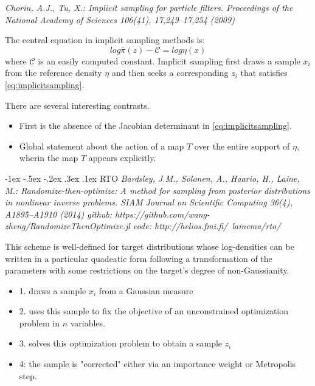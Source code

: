 \documentclass[a4paper, 11pt]{article}
\makeatletter
\newcommand{\xiaosihao}{\fontsize{12pt}{\baselineskip}\selectfont}
\renewcommand\subsubsection{\@startsection{subsubsection}{1}{\z@}%
{-1ex \@plus -.5ex \@minus -.2ex}%
{.3ex \@plus .1ex}%
{\normalfont\xiaosihao\CJKfamily{hei}}}
\makeatother
\begin{document}
\begin{CJK}{UTF8}{gbsn}
\emph{ Chorin, A.J., Tu, X.: Implicit sampling for particle filters. Proceedings of the National Academy of Sciences
106(41), 17,249–17,254 (2009)}

The central equation in implicit sampling methods is:
\begin{equation}\label{eq:implicitsampling}
log \bar{\pi}(z) - \mathcal{C} = log \eta(x)
\end{equation}
where $\mathcal{C}$ is an easily computed constant. Implicit sampling first draws a sample $x_i$ from the reference density $\eta$ and then seeks a corresponding $z_i$ that satisfies \eqref{eq:implicitsampling}.

There are several interesting contrasts.
\begin{itemize}
  \item First is the absence of the Jacobian determinant in \eqref{eq:implicitsampling}.
  \item Global statement about the action of a map $T$ over the entire support of $\eta$, wherin the map $T$ appears explicitly.
\end{itemize}



\subsubsection{RTO}
\emph{
  Bardsley, J.M., Solonen, A., Haario, H., Laine, M.: Randomize-then-optimize: A method for sampling
from posterior distributions in nonlinear inverse problems. SIAM Journal on Scientific Computing 36(4),
A1895–A1910 (2014)
github: https://github.com/wang-zheng/RandomizeThenOptimize.jl
code: http://helios.fmi.fi/~lainema/rto/
}


This scheme is well-defined for target distributions whose log-densities can be written in a particular quadeatic form following a transformation of the parameters with some restrictions on the target's degree of non-Gaussianity.
\begin{itemize}
  \item 1. draws a sample $x_i$ from a Gaussian measure
  \item 2. uses this sample to fix the objective of an unconstrained optimization problem in $n$ variables.
  \item 3. solves this optimization problem to obtain a sample $z_i$
  \item 4: the sample is "corrected" either via an importance weight or Metropolis step.
\end{itemize}


\end{CJK}
\end{document}
